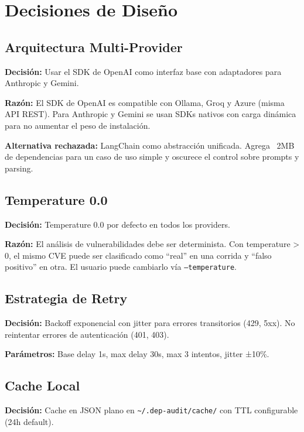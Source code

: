 \documentclass[11pt,a4paper]{article}
\begin{document}
\section{Decisiones de Diseño}

\subsection{Arquitectura Multi-Provider}

\textbf{Decisión:} Usar el SDK de OpenAI como interfaz base con adaptadores para Anthropic y Gemini.

\textbf{Razón:} El SDK de OpenAI es compatible con Ollama, Groq y Azure (misma API REST). Para Anthropic y Gemini se usan SDKs nativos con carga dinámica para no aumentar el peso de instalación.

\textbf{Alternativa rechazada:} LangChain como abstracción unificada. Agrega ~2MB de dependencias para un caso de uso simple y oscurece el control sobre prompts y parsing.

\subsection{Temperature 0.0}

\textbf{Decisión:} Temperature 0.0 por defecto en todos los providers.

\textbf{Razón:} El análisis de vulnerabilidades debe ser determinista. Con temperature > 0, el mismo CVE puede ser clasificado como ``real'' en una corrida y ``falso positivo'' en otra. El usuario puede cambiarlo vía \texttt{--temperature}.

\subsection{Estrategia de Retry}

\textbf{Decisión:} Backoff exponencial con jitter para errores transitorios (429, 5xx). No reintentar errores de autenticación (401, 403).

\textbf{Parámetros:} Base delay 1s, max delay 30s, max 3 intentos, jitter ±10\%.

\subsection{Cache Local}

\textbf{Decisión:} Cache en JSON plano en \texttt{\textasciitilde{}/.dep-audit/cache/} con TTL configurable (24h default).
\end{document}
